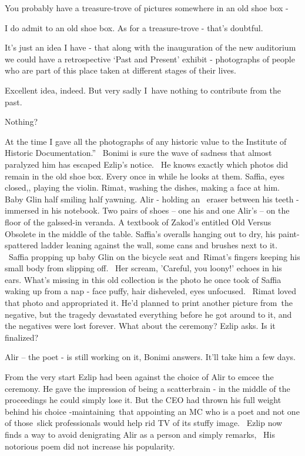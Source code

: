 \documentclass[12pt]{book}
\begin{document}
{\textquotedbl}You probably have a treasure-trove of pictures somewhere in an old shoe box -{\textquotedbl}

{\textquotedbl}I do admit to an old shoe box. As for a treasure-trove - that's doubtful.{\textquotedbl}~

{\textquotedbl}It's just an idea I have - that along with the inauguration of the new auditorium we could have a
retrospective `Past and Present' exhibit - photographs of people who are part of this place taken at different stages
of their lives.{\textquotedbl}

{\textquotedbl}Excellent idea, indeed. But very sadly I~have nothing to contribute from the past.{\textquotedbl}

{\textquotedbl}Nothing?{\textquotedbl}

{\textquotedbl}At the time I gave all the photographs of any historic value to the Institute of Historic
Documentation.'' \ Bonimi is sure the wave of sadness that{ }almost paralyzed him has escaped Ezlip's
notice. \ He knows exactly which photos did remain in the old shoe box. Every once in while he looks at them. Saffia,
eyes closed,, playing the violin. Rimat, washing the dishes, making a face at him. Baby Glin half smiling half yawning.
Alir - holding an{ }\ eraser between his teeth - immersed in his notebook. Two pairs of shoes -- one his
and one Alir's -- on the floor of the galssed-in veranda. A textbook of Zakod's entitled {\textquotedbl}Old Versus
Obsolete{\textquotedbl} in the middle of the table. Saffia's overalls hanging out to dry, his paint-spattered ladder
leaning against the wall, some cans and brushes next to it. ~Saffia propping up baby Glin on the bicycle seat
and~Rimat's fingers keeping his small body from slipping off. ~Her scream, 'Careful, you loony!' echoes in his ears.
What's missing in this old collection is the photo he once took of Saffia waking up from a nap - face puffy, hair
disheveled,{ }{eyes
unfocused.} ~Rimat loved that photo and appropriated it. He'd planned to print another picture from~the negative, but
the tragedy devastated everything before he got around to it, and the negatives were lost forever. {\textquotedbl}What
about the ceremony?{\textquotedbl} Ezlip asks. {\textquotedbl}Is it finalized?{\textquotedbl}

{\textquotedbl}Alir -- the poet - is still working on it,{\textquotedbl} Bonimi answers. {\textquotedbl}It'll take him a
few days.{\textquotedbl}

From the very start Ezlip had been against the choice of Alir to emcee the ceremony. He gave the impression of being a
scatterbrain - in the middle of the proceedings he could simply lose it. But the CEO had thrown his full weight behind
his choice -maintaining~that appointing an MC who is a poet and not one of those~slick professionals would help rid TV
of its stuffy image.{ }~Ezlip now finds a way to avoid denigrating Alir as a person and simply remarks,
\ {\textquotedbl}His notorious poem did not increase his popularity.{\textquotedbl}
\end{document}
